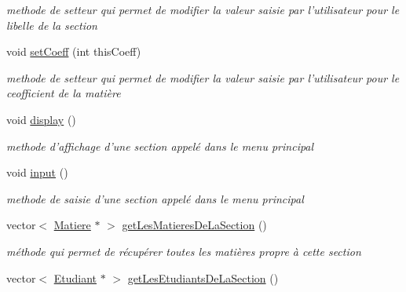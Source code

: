 \begin{DoxyCompactItemize}
\begin{DoxyCompactList}\small\item\em methode de setteur qui permet de modifier la valeur saisie par l'utilisateur pour le libelle de la section \end{DoxyCompactList}\item 
\hypertarget{class_section_adb0132002130e3ba5270dfd8e566170b}{void \hyperlink{class_section_adb0132002130e3ba5270dfd8e566170b}{set\+Coeff} (int this\+Coeff)}\label{class_section_adb0132002130e3ba5270dfd8e566170b}

\begin{DoxyCompactList}\small\item\em methode de setteur qui permet de modifier la valeur saisie par l'utilisateur pour le ceofficient de la matière \end{DoxyCompactList}\item 
\hypertarget{class_section_a1f9ebccdb1937ca61a0d4adcde310832}{void \hyperlink{class_section_a1f9ebccdb1937ca61a0d4adcde310832}{display} ()}\label{class_section_a1f9ebccdb1937ca61a0d4adcde310832}

\begin{DoxyCompactList}\small\item\em methode d'affichage d'une section appelé dans le menu principal \end{DoxyCompactList}\item 
\hypertarget{class_section_a32e3a0a0682f01437a82ddbf7dd59b0a}{void \hyperlink{class_section_a32e3a0a0682f01437a82ddbf7dd59b0a}{input} ()}\label{class_section_a32e3a0a0682f01437a82ddbf7dd59b0a}

\begin{DoxyCompactList}\small\item\em methode de saisie d'une section appelé dans le menu principal \end{DoxyCompactList}\item 
\hypertarget{class_section_aa28c77d3c8f481f443df2841d43989f0}{vector$<$ \hyperlink{class_matiere}{Matiere} $\ast$ $>$ \hyperlink{class_section_aa28c77d3c8f481f443df2841d43989f0}{get\+Les\+Matieres\+De\+La\+Section} ()}\label{class_section_aa28c77d3c8f481f443df2841d43989f0}

\begin{DoxyCompactList}\small\item\em méthode qui permet de récupérer toutes les matières propre à cette section \end{DoxyCompactList}\item 
\hypertarget{class_section_ab6ec912b6d6dc3291d11f00527f08b7d}{vector$<$ \hyperlink{class_etudiant}{Etudiant} $\ast$ $>$ \hyperlink{class_section_ab6ec912b6d6dc3291d11f00527f08b7d}{get\+Les\+Etudiants\+De\+La\+Section} ()}\label{class_section_ab6ec912b6d6dc3291d11f00527f08b7d}


\end{DoxyCompactItemize}
